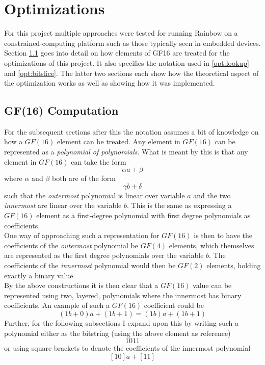 \section{Optimizations} \label{opti}
For this project multiple approaches were tested for running Rainbow on a constrained-computing platform such as those typically seen in embedded devices. Section \ref{opt:gf16comp} goes into detail on how elements of GF16 are treated for the optimizations of this project. It also specifies the notation used in \cref{opt:lookup} and \cref{opt:bitslice}. The latter two sections each show how the theoretical aspect of the optimization works as well as showing how it was implemented.
\subsection{GF(16) Computation} \label{opt:gf16comp}
For the subsequent sections after this the notation assumes a bit of knowledge on how a $GF(16)$ element can be treated. Any element in $GF(16)$ can be represented as a \emph{polynomial of polynomials}. What is meant by this is that any element in $GF(16)$ can take the form
$$
    \alpha a + \beta
$$
where $\alpha$ and $\beta$ both are of the form 
$$
    \gamma b + \delta
$$
such that the \emph{outermost} polynomial is linear over variable $a$ and the two \emph{innermost} are linear over the variable $b$. This is the same as expressing a $GF(16)$ element as a first-degree polynomial with first degree polynomials as coefficients.\medskip\\
One way of approaching such a representation for $GF(16)$ is then to have the coefficients of the \emph{outermost} polynomial be $GF(4)$ elements, which themselves are represented as the first degree polynomials over the variable $b$. The coefficients of the \emph{innermost} polynomial would then be $GF(2)$ elements, holding exactly a binary value.\medskip\\
By the above constructions it is then clear that a $GF(16)$ value can be represented using two, layered, polynomials where the innermost has binary coefficients. An example of such a $GF(16)$ coefficient could be
$$
    (1b + 0) a + (1b + 1) = (1b)a + (1b + 1)
$$
Further, for the following subsections I expand upon this by writing such a polynomial either as the bitstring (using the above element as reference)
$$
    1011
$$
or using square brackets to denote the coefficients of the innermost polynomial
$$
    [10]a + [11]
$$
